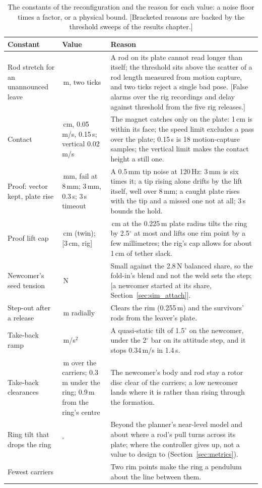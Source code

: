 \begin{table}[htbp]
\centering
\small
\caption[Reconfiguration constants and their reasons]{The constants of the reconfiguration and the reason for each
value: a noise floor times a factor, or a physical bound. [Bracketed reasons are backed by the threshold sweeps of
the results chapter.]}
\label{tab:constants}
\begin{tabularx}{\textwidth}{>{\raggedright\arraybackslash}p{3.6cm}>{\raggedright\arraybackslash}p{2.2cm}>{\raggedright\arraybackslash}X}
\toprule
Constant & Value & Reason \\
\midrule
Rod stretch for an unannounced leave & 0.06\,m, two ticks & A rod on its plate cannot read longer than itself; the
threshold sits above the scatter of a rod length measured from motion capture, and two ticks reject a single bad
pose. [False alarms over the rig recordings and delay against threshold from the five rig releases.] \\
Contact & 1\,cm, 0.05\,m/s, 0.15\,s; vertical 0.02\,m/s & The magnet catches only on the plate: 1\,cm is within its
face; the speed limit excludes a pass over the plate; 0.15\,s is 18 motion-capture samples; the vertical limit
makes the contact height a still one. \\
Proof: vector kept, plate rise & 3\,mm, fail at 8\,mm; 3\,mm, 0.3\,s; 3\,s timeout & A 0.5\,mm tip noise at 120\,Hz:
3\,mm is six times it; a tip rising alone drifts by the lift itself, well over 8\,mm; a caught plate rises with the
tip and a missed one not at all; 3\,s bounds the hold. \\
Proof lift cap & 1\,cm (twin); [3\,cm, rig] & 1\,cm at the 0.225\,m plate radius tilts the ring by 2.5$^\circ$ at
most and lifts one rim point by a few millimetres; the rig's cap allows for about 1\,cm of tether slack. \\
Newcomer's seed tension & 0.1\,N & Small against the 2.8\,N balanced share, so the fold-in's blend and not the weld
sets the step; [a newcomer started at its share, Section~\ref{sec:sim_attach}]. \\
Step-out after a release & 0.5\,m radially & Clears the rim (0.255\,m) and the survivors' rods from the leaver's
plate. \\
Take-back ramp & 0.25\,m/s$^2$ & A quasi-static tilt of 1.5$^\circ$ on the newcomer, under the 2$^\circ$ bar on its
attitude step, and it stops 0.34\,m/s in 1.4\,s. \\
Take-back clearances & 0.15\,m over the carriers; 0.3\,m under the ring; 0.9\,m from the ring's centre & The
newcomer's body and rod stay a rotor disc clear of the carriers; a low newcomer lands where it is rather than
rising through the formation. \\
Ring tilt that drops the ring & 30$^\circ$ & Beyond the planner's near-level model and about where a rod's pull turns
across its plate; where the controller gives up, not a value to design to (Section~\ref{sec:metrics}). \\
Fewest carriers & 3 & Two rim points make the ring a pendulum about the line between them. \\
\bottomrule
\end{tabularx}
\end{table}
